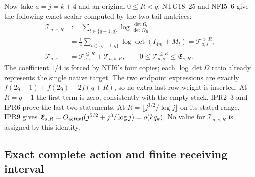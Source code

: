 Now take $a=j=k+4$ and an original $0\le R<q$.  NTG18--25 and
NFI5--6 give the following exact scalar computed by the two tail matrices:
\[
 \begin{split}
 \mathscr T_{a,s,R}
 &:=\sum_{t\in\{q-1,q\}}
              \log\frac{\det\Omega_t}{\det\Omega_R}\\
 &=\frac14\sum_{t\in\{q-1,q\}}\log\det(I_{4m}+M_t)
   =\mathcal T_{a,s}^{>R},\\
 \mathcal T_{a,s}&=\mathcal T_{a,s}^{\le R}+\mathscr T_{a,s,R},
 \qquad 0\le\mathcal T_{a,s}^{\le R}\le\mathfrak E_{s,R}.
 \end{split}
 \tag{TAC12}
\]
The coefficient $1/4$ is forced by NFI6's four copies; each
$\log\det\Omega$ ratio already represents the single native target.
The two endpoint expressions are exactly
$f(2q-1)+f(2q)-2f(q+R)$, so no extra last-row weight is inserted.
At $R=q-1$ the first term is zero, consistently with the empty stack.
IPR2--3 and IPR6 prove the last two statements.  At
$R=\lfloor j^{3/2}/\log j\rfloor$ on its stated range, IPR9 gives
$\mathfrak E_{s,R}=O_{\rm actual}(j^{5/2}+j^3/\log j)=o(kq_k)$.
No value for $\mathscr T_{a,s,R}$ is assigned by this identity.

\subsection{Exact complete action and finite receiving interval}

